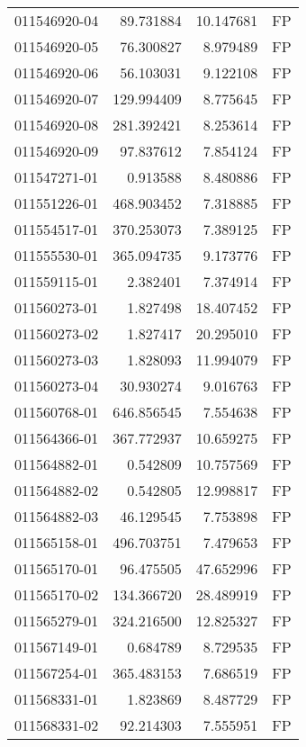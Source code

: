 \begin{tabular}{lrrl}
011546920-04 &   89.731884 &      10.147681 &   FP \\
011546920-05 &   76.300827 &       8.979489 &   FP \\
011546920-06 &   56.103031 &       9.122108 &   FP \\
011546920-07 &  129.994409 &       8.775645 &   FP \\
011546920-08 &  281.392421 &       8.253614 &   FP \\
011546920-09 &   97.837612 &       7.854124 &   FP \\
011547271-01 &    0.913588 &       8.480886 &   FP \\
011551226-01 &  468.903452 &       7.318885 &   FP \\
011554517-01 &  370.253073 &       7.389125 &   FP \\
011555530-01 &  365.094735 &       9.173776 &   FP \\
011559115-01 &    2.382401 &       7.374914 &   FP \\
011560273-01 &    1.827498 &      18.407452 &   FP \\
011560273-02 &    1.827417 &      20.295010 &   FP \\
011560273-03 &    1.828093 &      11.994079 &   FP \\
011560273-04 &   30.930274 &       9.016763 &   FP \\
011560768-01 &  646.856545 &       7.554638 &   FP \\
011564366-01 &  367.772937 &      10.659275 &   FP \\
011564882-01 &    0.542809 &      10.757569 &   FP \\
011564882-02 &    0.542805 &      12.998817 &   FP \\
011564882-03 &   46.129545 &       7.753898 &   FP \\
011565158-01 &  496.703751 &       7.479653 &   FP \\
011565170-01 &   96.475505 &      47.652996 &   FP \\
011565170-02 &  134.366720 &      28.489919 &   FP \\
011565279-01 &  324.216500 &      12.825327 &   FP \\
011567149-01 &    0.684789 &       8.729535 &   FP \\
011567254-01 &  365.483153 &       7.686519 &   FP \\
011568331-01 &    1.823869 &       8.487729 &   FP \\
011568331-02 &   92.214303 &       7.555951 &   FP \\

\end{tabular}
